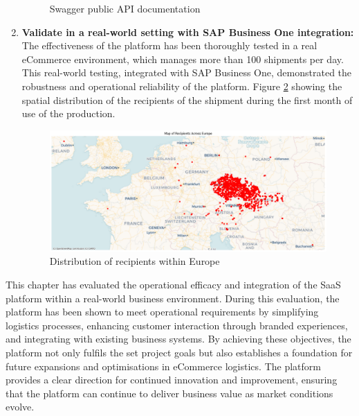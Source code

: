 \begin{enumerate}[label=\bfseries G\arabic*:,leftmargin=*]
\begin{figure}[H]
    \caption{Swagger public API documentation}
    \label{img08:fig:swagger_documentation}
    \end{figure}
    
    \item \textbf{Validate in a real-world setting with SAP Business One integration:} The effectiveness of the platform has been thoroughly tested in a real eCommerce environment, which manages more than 100 shipments per day. 
    This real-world testing, integrated with SAP Business One, demonstrated the robustness and operational reliability of the platform.
    Figure \ref{img08:plot:recipients_distribution} showing the spatial distribution of the recipients of the shipment during the first month of use of the production.
    \begin{figure}[H]\centering
    \includegraphics[width=140mm]{img/chap08/recipients_europe.png}
    \caption{Distribution of recipients within Europe}
    \label{img08:plot:recipients_distribution}
    \end{figure}
\end{enumerate}

This chapter has evaluated the operational efficacy and integration of the \ac{SaaS} platform within a real-world business environment.
During this evaluation, the platform has been shown to meet operational requirements by simplifying logistics processes, enhancing customer interaction through branded experiences, and integrating with existing business systems. 
By achieving these objectives, the platform not only fulfils the set project goals but also establishes a foundation for future expansions and optimisations in eCommerce logistics. 
The platform provides a clear direction for continued innovation and improvement, ensuring that the platform can continue to deliver business value as market conditions evolve.


